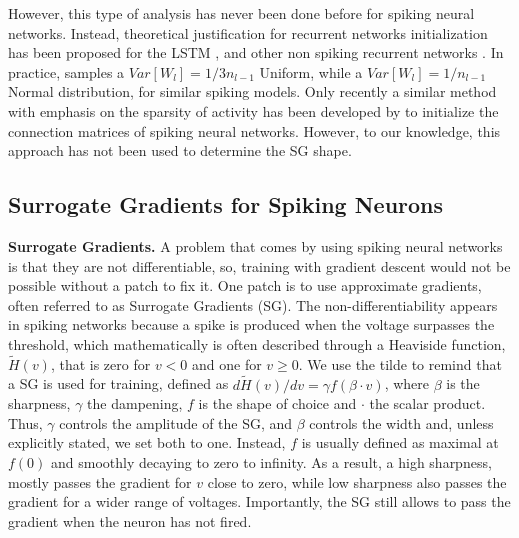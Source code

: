 However, this type of analysis has never been done before for spiking neural networks. Instead, theoretical justification for recurrent networks initialization has been proposed for the LSTM \cite{lstm_initialization}, and other non spiking recurrent networks \cite{hochreiter2001gradient, arjovsky2016unitary, pascanu2013difficulty}. 
In practice,  \cite{zenke2021remarkable} samples a $Var[W_l]=1/3n_{l-1}$ Uniform, while \cite{lsnn} a $Var[W_l]=1/n_{l-1}$ Normal distribution, for similar spiking models.
Only recently a similar method with emphasis on the sparsity of activity has been developed by \cite{rossbroich2022fluctuation} to initialize the connection matrices of spiking neural networks. However, to our knowledge, this approach has not been used to determine the SG shape.

\subsection{Surrogate Gradients for Spiking Neurons}
\noindent\textbf{Surrogate Gradients.}
A problem that comes by using spiking neural networks is that they are not differentiable, so, training with gradient descent would not be possible without a patch to fix it. One patch is to use approximate gradients, often referred to as Surrogate Gradients (SG).
The non-differentiability appears in spiking networks because a spike is produced when the voltage surpasses the threshold, which mathematically is often described through a Heaviside function, $\tilde{H}(v)$, that is  zero for $v<0$ and one for $v\geq 0$. We use the tilde to remind that a SG is used for training, defined as $d\tilde{H}(v)/dv = \gamma f(\beta\cdot v)$, where $\beta$ is the sharpness, $\gamma$ the dampening, $f$ is the shape of choice and $\cdot$ the scalar product. Thus, $\gamma$ controls the amplitude of the SG, and $\beta$ controls the width and, unless explicitly stated, we set both to one. Instead, $f$ is usually defined as maximal at $f(0)$ and smoothly decaying to zero to infinity. As a result, a high sharpness, mostly passes the gradient for $v$ close to zero, while low sharpness also passes the gradient for a wider range of voltages. Importantly, the SG still allows to pass the gradient when the neuron has not fired. 

